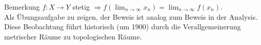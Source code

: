 \begin{bla}{Bemerkung}
  $ f: X \to Y $ stetig $ \Rightarrow f(\lim_{n \to \infty}x_n) = \lim_{n \to \infty}f(x_n) $. \\
  Als Übungsaufgabe zu zeigen, der Beweis ist analog zum Beweis in der Analysis. \\
  Diese Beobachtung führt historisch (um 1900) durch die Verallgemeinerung metrischer Räume zu topologischen Räume.
\end{bla}